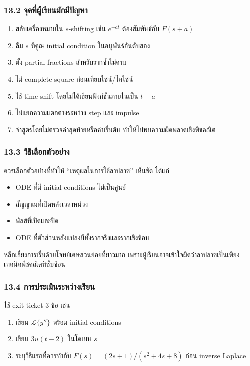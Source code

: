 \subsubsection{13.2 จุดที่ผู้เรียนมักมีปัญหา}

\begin{enumerate}
    \item สลับเครื่องหมายใน $s$-shifting เช่น $e^{-at}$ ต้องสัมพันธ์กับ $F(s+a)$
    \item ลืม $s$ ที่คูณ initial condition ในอนุพันธ์อันดับสอง
    \item ตั้ง partial fractions สำหรับรากซ้ำไม่ครบ
    \item ไม่ complete square ก่อนเทียบไซน์/โคไซน์
    \item ใช้ time shift โดยไม่ได้เขียนฟังก์ชันภายในเป็น $t-a$
    \item ไม่แยกความแตกต่างระหว่าง step และ impulse
    \item จำสูตรโดยไม่ตรวจค่าสุดท้ายหรือค่าเริ่มต้น ทำให้ไม่พบความผิดพลาดเชิงพีชคณิต
\end{enumerate}

\subsubsection{13.3 วิธีเลือกตัวอย่าง}

ควรเลือกตัวอย่างที่ทำให้ “เหตุผลในการใช้ลาปลาซ” เห็นชัด ได้แก่

\begin{itemize}
    \item ODE ที่มี initial conditions ไม่เป็นศูนย์
    \item สัญญาณที่เปิดหลังเวลาหน่วง
    \item พัลส์ที่เปิดและปิด
    \item ODE ที่ตัวส่วนหลังแปลงมีทั้งรากจริงและรากเชิงซ้อน
\end{itemize}

หลีกเลี่ยงการเริ่มด้วยโจทย์เศษส่วนย่อยที่ยาวมาก เพราะผู้เรียนอาจเข้าใจผิดว่าลาปลาซเป็นเพียงเทคนิคพีชคณิตที่ซับซ้อน

\subsubsection{13.4 การประเมินระหว่างเรียน}

ใช้ exit ticket 3 ข้อ เช่น

\begin{enumerate}
    \item เขียน $\mathcal{L}\{y''\}$ พร้อม initial conditions
    \item เขียน $3u(t-2)$ ในโดเมน $s$
    \item ระบุวิธีแรกที่ควรทำกับ $F(s)=(2s+1)/(s^2+4s+8)$ ก่อน inverse Laplace
\end{enumerate}

